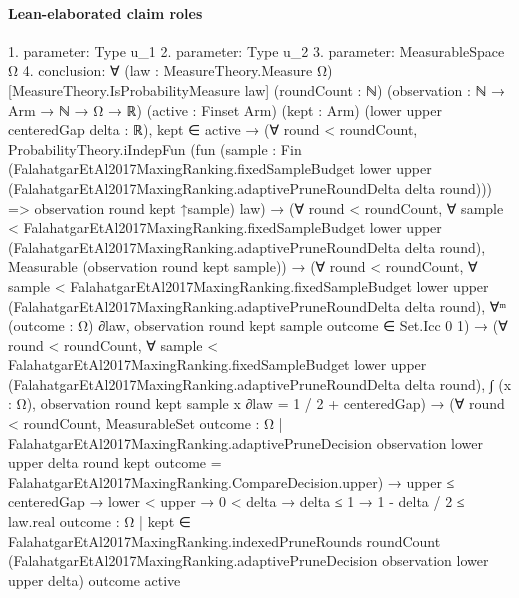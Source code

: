 \documentclass[10pt]{article}
\begin{document}
\paragraph{Lean-elaborated claim roles}\begin{ReviewVerbatim}
1. parameter: Type u_1
2. parameter: Type u_2
3. parameter: MeasurableSpace Ω
4. conclusion: ∀ (law : MeasureTheory.Measure Ω) [MeasureTheory.IsProbabilityMeasure law] (roundCount : ℕ)
  (observation : ℕ → Arm → ℕ → Ω → ℝ) (active : Finset Arm) (kept : Arm) (lower upper centeredGap delta : ℝ),
  kept ∈ active →
    (∀ round < roundCount,
        ProbabilityTheory.iIndepFun
          (fun
              (sample :
                Fin
                  (FalahatgarEtAl2017MaxingRanking.fixedSampleBudget lower upper
                    (FalahatgarEtAl2017MaxingRanking.adaptivePruneRoundDelta delta round))) =>
            observation round kept ↑sample)
          law) →
      (∀ round < roundCount,
          ∀
            sample <
              FalahatgarEtAl2017MaxingRanking.fixedSampleBudget lower upper
                (FalahatgarEtAl2017MaxingRanking.adaptivePruneRoundDelta delta round),
            Measurable (observation round kept sample)) →
        (∀ round < roundCount,
            ∀
              sample <
                FalahatgarEtAl2017MaxingRanking.fixedSampleBudget lower upper
                  (FalahatgarEtAl2017MaxingRanking.adaptivePruneRoundDelta delta round),
              ∀ᵐ (outcome : Ω) ∂law, observation round kept sample outcome ∈ Set.Icc 0 1) →
          (∀ round < roundCount,
              ∀
                sample <
                  FalahatgarEtAl2017MaxingRanking.fixedSampleBudget lower upper
                    (FalahatgarEtAl2017MaxingRanking.adaptivePruneRoundDelta delta round),
                ∫ (x : Ω), observation round kept sample x ∂law = 1 / 2 + centeredGap) →
            (∀ round < roundCount,
                MeasurableSet
                  {outcome : Ω |
                    FalahatgarEtAl2017MaxingRanking.adaptivePruneDecision observation lower upper delta round kept
                        outcome =
                      FalahatgarEtAl2017MaxingRanking.CompareDecision.upper}) →
              upper ≤ centeredGap →
                lower < upper →
                  0 < delta →
                    delta ≤ 1 →
                      1 - delta / 2 ≤
                        law.real
                          {outcome : Ω |
                            kept ∈
                              FalahatgarEtAl2017MaxingRanking.indexedPruneRounds roundCount
                                (FalahatgarEtAl2017MaxingRanking.adaptivePruneDecision observation lower upper delta)
                                outcome active}
\end{ReviewVerbatim}
\end{document}
